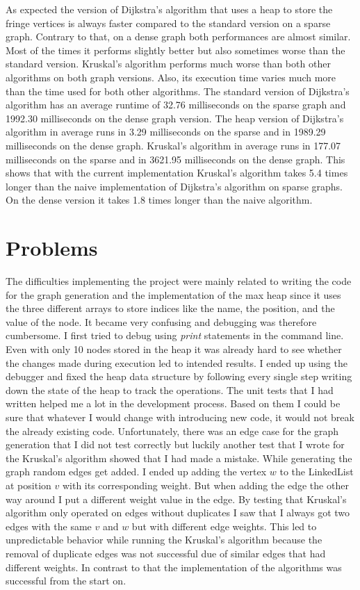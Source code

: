 \documentclass{article}
\begin{document}
As expected the version of Dijkstra's algorithm that uses a heap to store the fringe vertices is always faster compared to the standard version on a sparse graph. Contrary to that, on a dense graph both performances are almost similar. Most of the times it performs slightly better but also sometimes worse than the standard version. Kruskal's algorithm performs much worse than both other algorithms on both graph versions. Also, its execution time varies much more than the time used for both other algorithms.
The standard version of Dijkstra's algorithm has an average runtime of 32.76 milliseconds on the sparse graph and 1992.30 milliseconds on the dense graph version.
The heap version of Dijkstra's algorithm in average runs in 3.29 milliseconds on the sparse and in 1989.29 milliseconds on the dense graph.
Kruskal's algorithm in average runs in 177.07 milliseconds on the sparse and in 3621.95 milliseconds on the dense graph.
This shows that with the current implementation Kruskal's algorithm takes 5.4 times longer than the naive implementation of Dijkstra's algorithm on sparse graphs. On the dense version it takes 1.8 times longer than the naive algorithm.

\section{Problems}
The difficulties implementing the project were mainly related to writing the code for the graph generation and the implementation of the max heap since it uses the three different arrays to store indices like the name, the position, and the value of the node. It became very confusing and debugging was therefore cumbersome. I first tried to debug using \textit{print} statements in the command line. Even with only 10 nodes stored in the heap it was already hard to see whether the changes made during execution led to intended results. I ended up using the debugger and fixed the heap data structure by following every single step writing down the state of the heap to track the operations.
The unit tests that I had written helped me a lot in the development process. Based on them I could be sure that whatever I would change with introducing new code, it would not break the already existing code. Unfortunately, there was an edge case for the graph generation that I did not test correctly but luckily another test that I wrote for the Kruskal's algorithm showed that I had made a mistake. While generating the graph random edges get added. I ended up adding the vertex $w$ to the LinkedList at position $v$ with its corresponding weight. But when adding the edge the other way around I put a different weight value in the edge. By testing that Kruskal's algorithm only operated on edges without duplicates I saw that I always got two edges with the same $v$ and $w$ but with different edge weights. This led to unpredictable behavior while running the Kruskal's algorithm because the removal of duplicate edges was not successful due of similar edges that had different weights. 
In contrast to that the implementation of the algorithms was successful from the start on.
\end{document}
